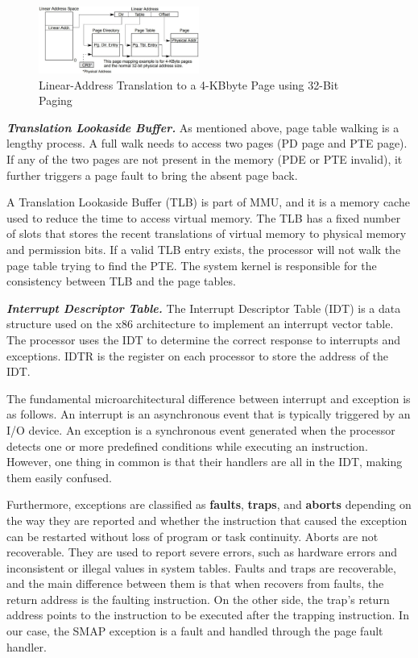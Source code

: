 \begin{figure}[th]
  \includegraphics[width=0.47\textwidth]{figures/pagetable}
  \centering
  \caption{Linear-Address Translation to a 4-KBbyte Page using 32-Bit Paging~\cite{intelpaging}}
  \label{fig:pagetable}
\end{figure}


\textbf{\textit{Translation Lookaside Buffer.}} As mentioned above, page table walking is a lengthy process. A full walk needs to access two pages (PD page and PTE page). If any of the two pages are not present in the memory (PDE or PTE invalid), it further triggers a page fault to bring the absent page back.

A Translation Lookaside Buffer (TLB) is part of MMU, and it is a memory cache used to reduce the time to access virtual memory. The TLB has a fixed number of slots that stores the recent translations of virtual memory to physical memory and permission bits. If a valid TLB entry exists, the processor will not walk the page table trying to find the PTE. The system kernel is responsible for the consistency between TLB and the page tables.


\textbf{\textit{Interrupt Descriptor Table.}} The Interrupt Descriptor Table (IDT) is a data structure used on the x86 architecture to implement an interrupt vector table. The processor uses the IDT to determine the correct response to interrupts and exceptions. IDTR is the register on each processor to store the address of the IDT.


The fundamental microarchitectural difference between interrupt and exception is as follows.  An interrupt is an asynchronous event
that is typically triggered by an I/O device. An exception is a
synchronous event generated when the processor detects one
or more predefined conditions while executing an instruction. However, one thing in common is that their handlers are all in the IDT, making them easily confused.

Furthermore, exceptions are classified as \textbf{faults}, \textbf{traps}, and \textbf{aborts} depending on the way they are reported and whether the instruction that caused the exception can be restarted without loss of program or task continuity. Aborts are not recoverable. They are used to report severe errors, such as hardware errors and inconsistent or illegal values in system tables. Faults and traps are recoverable, and the main difference between them is that when recovers from faults, the return address is the faulting instruction. On the other side, the trap's return address points to the instruction to be executed after the trapping instruction. In our case, the SMAP exception is a fault and handled through the page fault handler.

